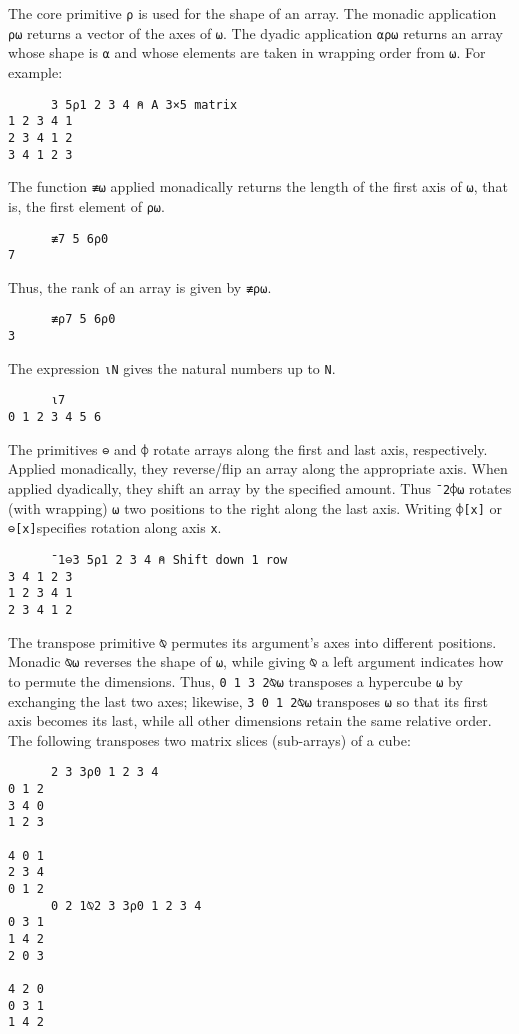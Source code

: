 \documentclass[10pt,twocolumn,english,format=sigplan,screen,balance]{acmart}
\begin{document}
The core primitive \texttt{⍴} is used for the shape of an array. The
monadic application \texttt{⍴⍵} returns a vector of the axes of \texttt{⍵}.
The dyadic application \texttt{⍺⍴⍵} returns an array whose shape is
\texttt{⍺} and whose elements are taken in wrapping order from \texttt{⍵}.
For example:
\begin{verbatim}
      3 5⍴1 2 3 4 ⍝ A 3×5 matrix
1 2 3 4 1
2 3 4 1 2
3 4 1 2 3
\end{verbatim}
The function \texttt{≢⍵} applied monadically returns the length of
the first axis of \texttt{⍵}, that is, the first element of \texttt{⍴⍵}. 
\begin{verbatim}
      ≢7 5 6⍴0
7
\end{verbatim}
Thus, the rank of an array is given by \texttt{≢⍴⍵}.
\begin{verbatim}
      ≢⍴7 5 6⍴0
3
\end{verbatim}
The expression \texttt{⍳N} gives the natural numbers up to \texttt{N}.
\begin{verbatim}
      ⍳7
0 1 2 3 4 5 6
\end{verbatim}
The primitives \texttt{⊖} and \texttt{⌽} rotate arrays along the first
and last axis, respectively. Applied monadically, they reverse/flip
an array along the appropriate axis. When applied dyadically, they
shift an array by the specified amount. Thus \texttt{¯2⌽⍵} rotates
(with wrapping) \texttt{⍵} two positions to the right along the last
axis. Writing \texttt{⌽{[}x{]}} or \texttt{⊖{[}x{]}}specifies rotation
along axis \texttt{x}. 
\begin{verbatim}
      ¯1⊖3 5⍴1 2 3 4 ⍝ Shift down 1 row
3 4 1 2 3
1 2 3 4 1
2 3 4 1 2
\end{verbatim}
The transpose primitive \texttt{⍉} permutes its argument's axes into
different positions. Monadic \texttt{⍉⍵} reverses the shape of \texttt{⍵},
while giving \texttt{⍉} a left argument indicates how to permute the
dimensions. Thus, \texttt{0 1 3 2⍉⍵} transposes a hypercube \texttt{⍵}
by exchanging the last two axes; likewise, \texttt{3 0 1 2⍉⍵} transposes
\texttt{⍵} so that its first axis becomes its last, while all other
dimensions retain the same relative order. The following transposes
two matrix slices (sub-arrays) of a cube:
\begin{verbatim}
      2 3 3⍴0 1 2 3 4
0 1 2
3 4 0
1 2 3
     
4 0 1
2 3 4
0 1 2
      0 2 1⍉2 3 3⍴0 1 2 3 4
0 3 1
1 4 2
2 0 3
     
4 2 0
0 3 1
1 4 2
\end{verbatim}
\end{document}
